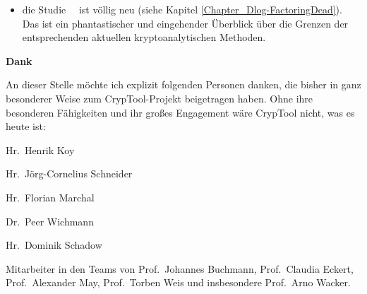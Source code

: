 \begin{itemize}
  \item die Studie ~\glqq {}\grqq~ist völlig neu
	(siehe Kapitel \ref{Chapter_Dlog-FactoringDead}). Das ist ein
	phantastischer und eingehender Überblick über die Grenzen der
	entsprechenden aktuellen kryptoanalytischen Methoden.
\end{itemize}



\newpage
\noindent \textbf{Dank}

An dieser Stelle möchte ich explizit folgenden Personen danken,
die bisher in ganz besonderer Weise zum CrypTool-Projekt
beigetragen haben.
Ohne ihre besonderen Fähigkeiten und ihr großes Engagement wäre CrypTool
nicht, was es heute ist:
\vspace{-6pt}
\begin{list}{\textbullet}{\addtolength{\itemsep}{-0.5\baselineskip}}
   \item Hr.\ Henrik Koy
   \item Hr.\ Jörg-Cornelius Schneider
   \item Hr.\ Florian Marchal
   \item Dr.\ Peer Wichmann
   \item Hr.\ Dominik Schadow
   \item Mitarbeiter in den Teams von
         Prof.\ Johannes Buchmann,
         Prof.\ Claudia Eckert,
         Prof.~Alexander May,
         Prof.~Torben Weis und insbesondere
         Prof.\ Arno Wacker.
\end{list}

